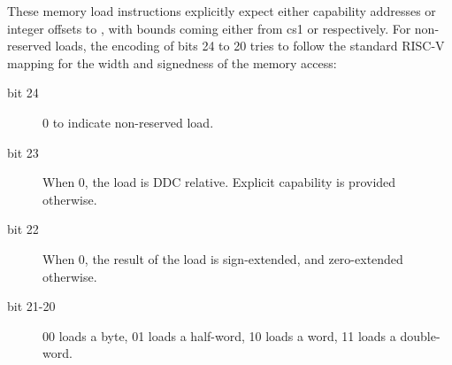 {		\vspace{1.5ex}




		\vspace{1.5ex}






		\rvcheriheader









These memory load instructions explicitly expect either capability addresses
or integer offsets to \DDC{}, with bounds coming either from cs1 or \DDC{}
respectively. For non-reserved loads, the encoding of bits 24 to 20 tries to
follow the standard RISC-V mapping for the width and signedness of the memory
access:
\begin{description}
\item [bit 24] 0 to indicate non-reserved load.
\item [bit 23] When 0, the load is DDC relative. Explicit capability is provided otherwise.
\item [bit 22] When 0, the result of the load is sign-extended, and zero-extended otherwise.
\item [bit 21-20] 00 loads a byte, 01 loads a half-word, 10 loads a word, 11 loads a double-word.
\end{description}

}

